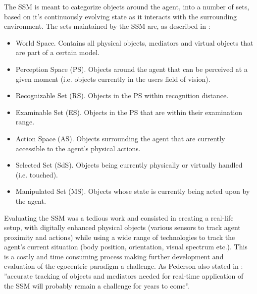 The SSM is meant to categorize objects around the agent, into a number of sets, based on it's continuously evolving state as it interacts with the surrounding environment. The sets maintained by the SSM are, as described in \cite{pederson2010towards}:
\begin{itemize}
	\item World Space. Contains all physical objects, mediators and virtual objects that are part of a certain model.
	\item Perception Space (PS). Objects around the agent that can be perceived at a given moment (i.e. objects currently in the users field of vision).
	\item Recognizable Set (RS). Objects in the PS within recognition distance.
	\item Examinable Set (ES). Objects in the PS that are within their examination range.
	\item Action Space (AS). Objects surrounding the agent that are currently accessible to the agent's physical actions.
	\item Selected Set (SdS). Objects being currently physically or virtually handled (i.e. touched).
	\item Manipulated Set (MS). Objects whose state is currently being acted upon by the agent.
\end{itemize}

Evaluating the SSM was a tedious work and consisted in creating a real-life setup, with digitally enhanced physical objects (various sensors to track agent proximity and actions) while using a wide range of technologies to track the agent's current situation (body position, orientation, visual spectrum etc.). This is a costly and time consuming process making further development and evaluation of the egocentric paradigm a challenge. As Pederson also stated in \cite{pederson2011situative}: ''accurate tracking of objects and mediators needed for real-time application of the SSM will probably remain a challenge for years to come''.\\


